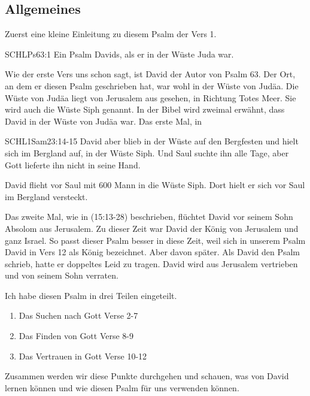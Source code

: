 \documentclass[14pt]{../../inc/mybib}
\begin{document}
    \subsection*{Allgemeines}
    \begin{block}[Allgemeines]
    Zuerst eine kleine Einleitung zu diesem Psalm der Vers 1.
        \begin{bibelbox}{SCHL}{Ps}{63:1}
            Ein Psalm Davids, als er in der Wüste Juda war.
        \end{bibelbox}
    Wie der erste Vers uns schon sagt, ist David der Autor von Psalm 63. Der Ort, an dem er diesen Psalm geschrieben hat, war wohl in der Wüste von Judäa. Die Wüste von Judäa liegt von Jerusalem aus gesehen, in Richtung Totes Meer. Sie wird auch die Wüste Siph genannt. In der Bibel wird zweimal erwähnt, dass David in der Wüste von Judäa war. Das erste Mal, in     
    \begin{bibelbox}{SCHL}{1Sam}{23:14-15}
        David aber blieb in der Wüste auf den Bergfesten und hielt sich im Bergland auf, in der Wüste Siph. Und Saul suchte ihn alle Tage, aber Gott lieferte ihn nicht in seine Hand.
    \end{bibelbox}    
    David flieht vor Saul mit 600 Mann in die Wüste Siph. Dort hielt er sich vor Saul im Bergland versteckt.
    
    Das zweite Mal, wie in (15:13-28) beschrieben, flüchtet David vor seinem Sohn Absolom aus Jerusalem. Zu dieser Zeit war David der König von Jerusalem und ganz Israel. So passt dieser Psalm besser in diese Zeit, weil sich in unserem Psalm David in Vers 12 als König bezeichnet. Aber davon später. Als David den Psalm schrieb, hatte er doppeltes Leid zu tragen. David wird aus Jerusalem vertrieben und von seinem Sohn verraten.
    \end{block}
    \begin{block}
        Ich habe diesen Psalm in drei Teilen eingeteilt. 
        \begin{enumerate}
            \item Das Suchen nach Gott Verse 2-7
            \item Das Finden von Gott Verse 8-9
            \item Das Vertrauen in Gott Verse 10-12
        \end{enumerate}
        Zusammen werden wir diese Punkte durchgehen und schauen, was  von David lernen können und wie  diesen Psalm für uns verwenden können.
    \end{block}
\end{document}
